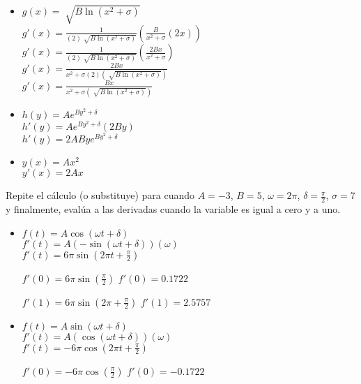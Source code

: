 \documentclass[10pt, a4paper]{article}
\begin{document}
\begin{enumerate}
\begin{itemize}
\begin{itemize}
                    \item$g(x) = \sqrt[]{B\ln(x^2+\sigma)}$\\
                    $g'(x) = \frac{1}{(2)\sqrt[]{B \ln(x^2+\sigma)}}(\frac{B}{x^2+\sigma}(2x))$\\
                    $g'(x) = \frac{1}{(2)\sqrt[]{B\ln(x^2+\sigma)}}(\frac{2Bx}{x^2+\sigma})$\\
                    $g'(x) = \frac{2Bx}{x^2+\sigma(2)(\sqrt[]{B\ln(x^2+\sigma)})}$\\
                    $g'(x) = \frac{Bx}{x^2+\sigma(\sqrt[]{B\ln(x^2+\sigma)})}$

                    \item$h(y) = A e^{By^2+\delta}$\\
                    $h'(y) = A e^{By^2+\delta}(2By)$\\
                    $h'(y) = 2ABy e^{By^2+\delta}$

                    \item$y(x) = Ax^2$\\
                    $y'(x) = 2Ax$
                \end{itemize}

                Repite el cálculo (o substituye) para cuando $A = -3$, $B = 5$, $\omega = 2\pi$, $\delta = \frac{\pi}{2}$,
                $\sigma = 7$ y finalmente, evalúa a las derivadas cuando la variable es igual a cero y a uno.

                \begin{itemize}
                    \item$f(t) = A\cos(\omega t + \delta)$\\
                    $f'(t)=A(-\sin(\omega t + \delta))(\omega)$\\
                    $f'(t)=6\pi \sin(2\pi t + \frac{\pi}{2})$

                    $f'(0)=6\pi \sin(\frac{\pi}{2})$
                    $f'(0)=0.1722$

                    $f'(1)=6\pi \sin(2\pi + \frac{\pi}{2})$
                    $f'(1)=2.5757$
                    

                    \item$f(t) = A\sin(\omega t + \delta)$\\
                    $f'(t)=A(\cos(\omega t + \delta))(\omega)$\\
                    $f'(t)=-6\pi \cos(2\pi t + \frac{\pi}{2})$

                    $f'(0)=-6\pi \cos(\frac{\pi}{2})$
                    $f'(0)=-0.1722$


\end{itemize}
\end{itemize}
\end{enumerate}
\end{document}
